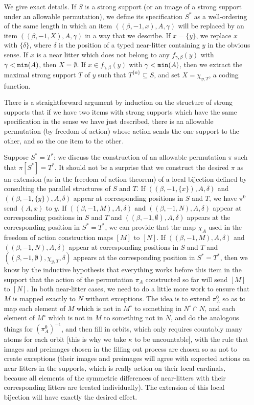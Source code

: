 We give exact details.  If $S$ is a strong support (or an image of a strong support under an allowable permutation), we define
its specification $S^*$ as a well-ordering of the same length in which an item $((\beta,-1,x),A,\gamma)$ will be replaced by an item
$((\beta,-1,X),A,\gamma)$ in a way that we describe.  If $x=\{y\}$, we replace $x$ with $\{\delta\}$, where $\delta$ is the position of a typed near-litter containing $y$ in the obvious sense.  If $x$ is a near litter which does not belong to any $f_{\gamma,\beta}(y)$ with $\gamma<{\tt min}(A)$, then
$X= \emptyset$.  If $x \in f_{\gamma,\beta}(y)$ with $\gamma<{\tt min}(A)$, then we extract the maximal strong support $T$ of $y$ such that
$T^{\{\alpha\}} \subseteq S$, and set $X = \chi_{y,T}$, a coding function.

There is a straightforward argument by induction on the structure of strong supports that if we have two items with strong supports which have the same specification in the sense we have just described, there is an allowable permutation (by freedom of action) whose action sends the one support to the other, and so the one item to the other.

Suppose $S^* = T^*$:  we discuss the construction of an allowable permutation $\pi$ such that $\pi[S^*]=T^*$.  It should not be a surprise
that we construct the desired $\pi$ as an extension (as in the freedom of action theorem) of a local bijection defined by consulting the parallel structures of $S$ and $T$.  If $((\beta,-1,\{x\}),A,\delta)$ and $((\beta,-1,\{y\}),A,\delta)$ appear at corresponding positions in $S$ and $T$, we have $\pi^0$ send
$(A,x)$ to $y$.  If $((\beta,-1,M),A,\delta)$ and $((\beta,-1,N),A,\delta)$ appear at corresponding positions in $S$ and $T$ and $((\beta,-1,\emptyset),A,\delta)$ appears at the corresponding position in $S^*=T^*$, we can provide that the map $\chi_A$ used in the freedom of action construction
maps $[M]$ to $[N]$.  If $((\beta,-1,M),A,\delta)$ and $((\beta,-1,N),A,\delta)$ appear at corresponding positions in $S$ and $T$ and $((\beta,-1,\emptyset),\chi_{y,T},\delta)$ appears at the corresponding position in $S^*=T^*$,  then we know by the inductive hypothesis that everything works before this item in the support that the action of the permutation $\pi_A$ constructed so far will send $[M]$ to $[N]$.  In both near-litter cases, we need to do a little more work to ensure that $M$ is mapped exactly to $N$ without exceptions.  The idea is to extend $\pi^0_A$ so as to map each element of
$M$ which is not in $M^\circ$ to something in $N^\circ \cap N$, and each element of $M^\circ$ which is not in $M$ to something not in $N$, and do the analogous things for $(\pi^0_A)^{-1}$, and then fill in orbits, which only requires countably many atoms for each orbit [this is why we take $\kappa$ to be uncountable], with the rule that images and preimages chosen in the filling out process are chosen so as not to create exceptions (their images and preimages will agree with expected actions on near-litters in the supports, which is really action on their local cardinals, because all elements of the symmetric differences of near-litters with their corresponding litters are treated individually).  The extension of this local bijection will have exactly the desired effect.

